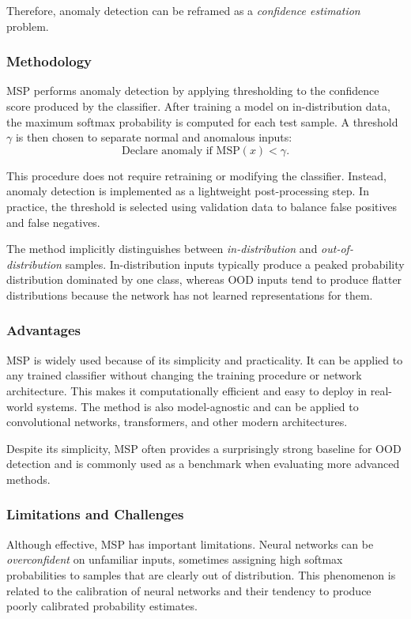 \documentclass{article}
\begin{document}
Therefore, anomaly detection can be reframed as a \emph{confidence estimation}
problem.

\subsubsection{Methodology}

MSP performs anomaly detection by applying thresholding to the confidence score
produced by the classifier. After training a model on in-distribution data, the
maximum softmax probability is computed for each test sample. A threshold
$\gamma$ is then chosen to separate normal and anomalous inputs:
\[
\text{Declare anomaly if } \text{MSP}(x) < \gamma.
\]

This procedure does not require retraining or modifying the classifier.
Instead, anomaly detection is implemented as a lightweight post-processing
step. In practice, the threshold is selected using validation data to balance
false positives and false negatives.

The method implicitly distinguishes between \emph{in-distribution} and
\emph{out-of-distribution} samples. In-distribution inputs typically produce a
peaked probability distribution dominated by one class, whereas OOD inputs tend
to produce flatter distributions because the network has not learned
representations for them.

\subsubsection{Advantages}

MSP is widely used because of its simplicity and practicality. It can be applied
to any trained classifier without changing the training procedure or network
architecture. This makes it computationally efficient and easy to deploy in
real-world systems. The method is also model-agnostic and can be applied to
convolutional networks, transformers, and other modern architectures.

Despite its simplicity, MSP often provides a surprisingly strong baseline for
OOD detection and is commonly used as a benchmark when evaluating more advanced
methods.

\subsubsection{Limitations and Challenges}

Although effective, MSP has important limitations. Neural networks can be
\emph{overconfident} on unfamiliar inputs, sometimes assigning high softmax
probabilities to samples that are clearly out of distribution. This phenomenon
is related to the calibration of neural networks and their tendency to produce
poorly calibrated probability estimates.
\end{document}
